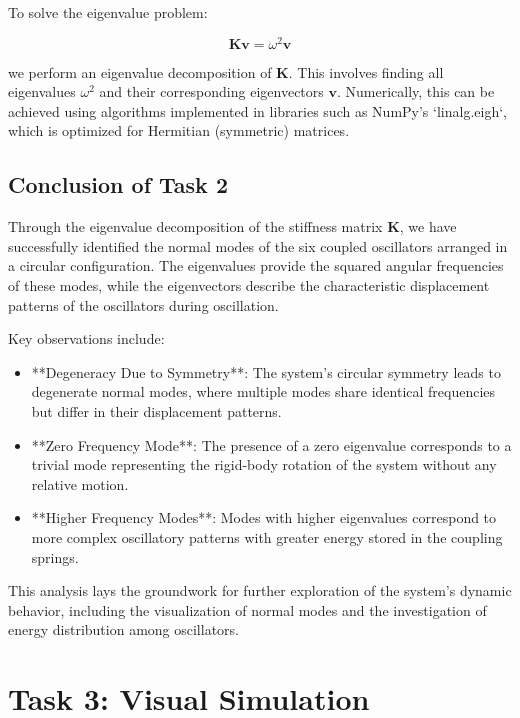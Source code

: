 \documentclass[12pt]{report} %
\begin{document}
To solve the eigenvalue problem:

\[
\mathbf{K} \mathbf{v} = \omega^2 \mathbf{v}
\]

we perform an eigenvalue decomposition of \( \mathbf{K} \). This involves finding all eigenvalues \( \omega^2 \) and their corresponding eigenvectors \( \mathbf{v} \). Numerically, this can be achieved using algorithms implemented in libraries such as NumPy's `linalg.eigh`, which is optimized for Hermitian (symmetric) matrices.

\subsection{Conclusion of Task 2}
\label{subsec:part2_task2_conclusion}

Through the eigenvalue decomposition of the stiffness matrix \( \mathbf{K} \), we have successfully identified the normal modes of the six coupled oscillators arranged in a circular configuration. The eigenvalues provide the squared angular frequencies of these modes, while the eigenvectors describe the characteristic displacement patterns of the oscillators during oscillation.

Key observations include:

\begin{itemize}
    \item **Degeneracy Due to Symmetry**: The system's circular symmetry leads to degenerate normal modes, where multiple modes share identical frequencies but differ in their displacement patterns.
    \item **Zero Frequency Mode**: The presence of a zero eigenvalue corresponds to a trivial mode representing the rigid-body rotation of the system without any relative motion.
    \item **Higher Frequency Modes**: Modes with higher eigenvalues correspond to more complex oscillatory patterns with greater energy stored in the coupling springs.
\end{itemize}

This analysis lays the groundwork for further exploration of the system's dynamic behavior, including the visualization of normal modes and the investigation of energy distribution among oscillators.

\newpage




\section{Task 3: Visual Simulation}
\label{sec:part2_task3}
\end{document}

